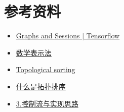 \documentclass[12pt, a4paper]{article}
\begin{document}
\section{参考资料}
\begin{itemize}
  \item \href{https://www.tensorflow.org/guide/graphs}{Graphs and Sessions | Tensorflow}
  \item \href{https://wuyuans.com/2012/10/mathematical-symbols}{数学表示法}
  \item \href{https://en.wikipedia.org/wiki/Topological_sorting}{Topological sorting}
  \item \href{https://www.jianshu.com/p/b59db381561a}{什么是拓扑排序}
  \item \href{https://www.jianshu.com/p/ece68117538e}{3.控制流与实现思路}
\end{itemize}
\end{document}
